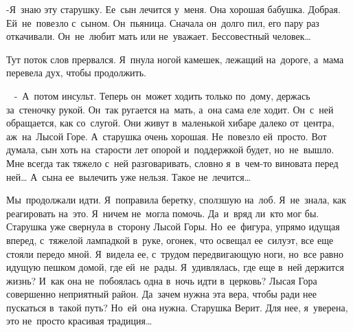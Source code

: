 -Я~знаю эту старушку.
Ее~сын лечится у~меня.
Она хорошая бабушка.
Добрая.
Ей~не~повезло с~сыном.
Он~пьяница.
Сначала он~долго пил, его пару раз откачивали.
Он~не~любит мать или не~уважает.
Бессовестный человек…
 
Тут поток слов прервался.
Я~пнула ногой камешек, лежащий на~дороге, а~мама перевела дух, чтобы продолжить.

~
-~А~потом инсульт.
Теперь он~может ходить только по~дому, держась за~стеночку рукой.
Он~так ругается на~мать, а~она сама еле ходит.
Он~с~ней обращается, как со~слугой.
Они живут в~маленькой хибаре далеко от~центра, аж~на~Лысой Горе.
А~старушка очень хорошая.
Не~повезло ей~просто.
Вот думала, сын хоть на~старости лет опорой и~поддержкой будет, но~не~вышло.
Мне всегда так тяжело с~ней разговаривать, словно я~в~чем-то виновата перед ней… А~сына ее~вылечить уже нельзя.
Такое не~лечится…
 
Мы~продолжали идти.
Я~поправила беретку, сползшую на~лоб.
Я~не~знала, как реагировать на~это.
Я~ничем не~могла помочь.
Да~и~вряд ли~кто мог бы.
Старушка уже свернула в~сторону Лысой Горы.
Но~ее~фигура, упрямо идущая вперед, с~тяжелой лампадкой в~руке, огонек, что освещал ее~силуэт, все еще стояли передо мной.
Я~видела ее, с~трудом передвигающую ноги, но~все равно идущую пешком домой, где ей~не~рады.
Я~удивлялась, где еще в~ней держится жизнь? И~как она не~побоялась одна в~ночь идти в~церковь? Лысая Гора совершенно неприятный район.
Да~зачем нужна эта вера, чтобы ради нее пускаться в~такой путь? Но~ей~она нужна.
Старушка Верит.
Для нее, я~уверена, это не~просто красивая традиция… 
